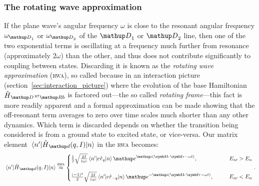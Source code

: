 \subsubsection{The rotating wave approximation}
If the plane wave's angular frequency $\omega$ is close to the resonant angular frequency $\omega_{\up{D}_1}$ or $\omega_{\up{D}_2}$ of the $\up{D}_1$ or $\up{D}_2$ line, then one of the two exponential terms is oscillating at a frequency much further from resonance (approximately $2\omega$) than the other, and thus does not contribute significantly to coupling between states. Discarding it is known as the \emph{rotating wave approximation} (\textsc{rwa}), so called because in an interaction picture (section~\ref{sec:interaction_picture}) where the evolution of the base Hamiltonian $\hat H_{\up{D}\,^{87}\up{Rb}}$ is factored out---the so called \emph{rotating frame}---this fact is more readily apparent and a formal approximation can be made showing that the off-resonant term averages to zero over time scales much shorter than any other dynamics. Which term is discarded depends on whether the transition being considered is from a ground state to excited state, or vice-versa. Our matrix element $\matrixel{n^\prime}{\hat H_\up{d}(q,I)}{n}$ in the \textsc{rwa} becomes:
\begin{align}\label{eq:rwa_no_rabifreq}
\matrixel{n^\prime}{\hat H_\up{d}(q,I)}{n} \overset{\textsc{rwa}}\approx
\begin{cases}
\frac12\sqrt{\frac{2I}{\varepsilon_0 c}}
\matrixel{n^\prime}
  {e\hat r_q}
  {n}\ee^{\ii(\vec k \cdot \vec r - \omega t)},\qquad &E_{n\prime} > E_n\\
\\
\frac{(-1)^q}2\sqrt{\frac{2I}{\varepsilon_0 c}}
\matrixel{n^\prime}
  {e\hat r_{-q}}
  {n} \ee^{-\ii(\vec k \cdot \vec r - \omega t)},\qquad &E_{n\prime} < E_n
\end{cases}.
\end{align}

